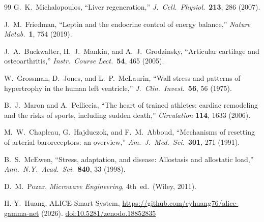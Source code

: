 \documentclass[aps,pre,twocolumn,superscriptaddress,floatfix]{revtex4-2}
\begin{document}
\begin{thebibliography}{99}
G.~K.~Michalopoulos,
``Liver regeneration,''
\emph{J.\ Cell.\ Physiol.}\ \textbf{213}, 286 (2007).

J.~M.~Friedman,
``Leptin and the endocrine control of energy balance,''
\emph{Nature Metab.}\ \textbf{1}, 754 (2019).

J.~A.~Buckwalter, H.~J.~Mankin, and A.~J.~Grodzinsky,
``Articular cartilage and osteoarthritis,''
\emph{Instr.\ Course Lect.}\ \textbf{54}, 465 (2005).

W.~Grossman, D.~Jones, and L.~P.~McLaurin,
``Wall stress and patterns of hypertrophy in the human
left ventricle,''
\emph{J.\ Clin.\ Invest.}\ \textbf{56}, 56 (1975).

B.~J.~Maron and A.~Pelliccia,
``The heart of trained athletes: cardiac remodeling and the
risks of sports, including sudden death,''
\emph{Circulation} \textbf{114}, 1633 (2006).

M.~W.~Chapleau, G.~Hajduczok, and F.~M.~Abboud,
``Mechanisms of resetting of arterial baroreceptors:
an overview,''
\emph{Am.\ J.\ Med.\ Sci.}\ \textbf{301}, 271 (1991).

B.~S.~McEwen, ``Stress, adaptation, and disease:
Allostasis and allostatic load,''
\emph{Ann.\ N.Y.\ Acad.\ Sci.}\ \textbf{840}, 33 (1998).

D.~M.~Pozar, \emph{Microwave Engineering}, 4th~ed.\
(Wiley, 2011).

H.-Y.~Huang, ALICE Smart System,
\url{https://github.com/cyhuang76/alice-gamma-net} (2026).
\href{https://doi.org/10.5281/zenodo.18852835}{doi:10.5281/zenodo.18852835}

\end{thebibliography}
\end{document}
